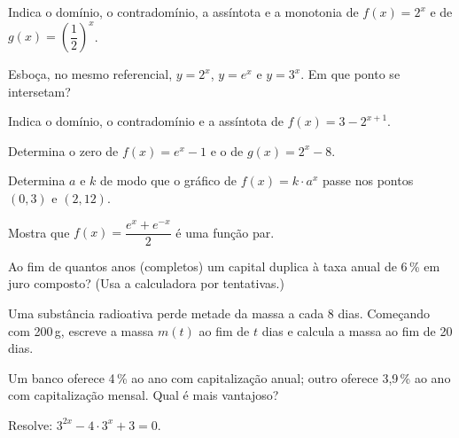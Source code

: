 \documentclass[12pt]{article}
\begin{document}
\begin{exercicios}
  \item Indica o domínio, o contradomínio, a assíntota e a monotonia de $f(x) = 2^x$ e de $g(x) = \left(\dfrac{1}{2}\right)^x$.
  \item Esboça, no mesmo referencial, $y = 2^x$, $y = e^x$ e $y = 3^x$. Em que ponto se intersetam?
  \item Indica o domínio, o contradomínio e a assíntota de $f(x) = 3 - 2^{x+1}$.
  \item Determina o zero de $f(x) = e^x - 1$ e o de $g(x) = 2^{x} - 8$.
  \item Determina $a$ e $k$ de modo que o gráfico de $f(x) = k \cdot a^x$ passe nos pontos $(0, 3)$ e $(2, 12)$.
  \item Mostra que $f(x) = \dfrac{e^x + e^{-x}}{2}$ é uma função par.
\end{exercicios}

\begin{exercicios}
  \item Ao fim de quantos anos (completos) um capital duplica à taxa anual de 6\,\% em juro composto? (Usa a calculadora por tentativas.)
  \item Uma substância radioativa perde metade da massa a cada 8 dias. Começando com 200\,g, escreve a massa $m(t)$ ao fim de $t$ dias e calcula a massa ao fim de 20 dias.
  \item Um banco oferece 4\,\% ao ano com capitalização anual; outro oferece 3,9\,\% ao ano com capitalização mensal. Qual é mais vantajoso?
  \item Resolve: $3^{2x} - 4 \cdot 3^{x} + 3 = 0$.
\end{exercicios}
\end{document}
